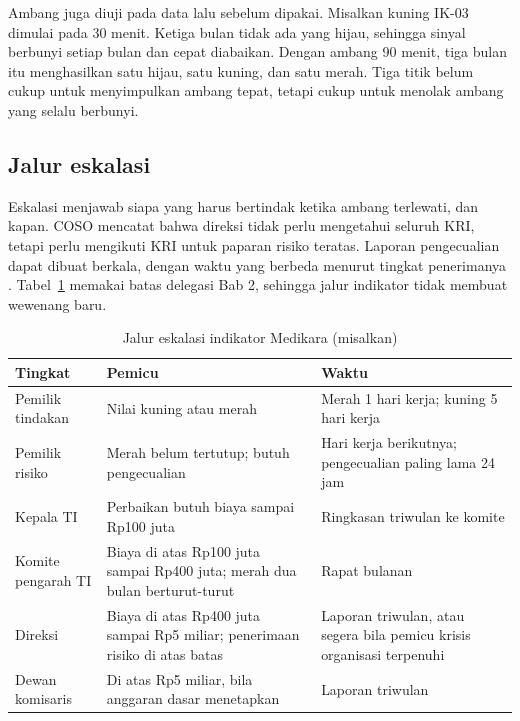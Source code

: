 Ambang juga diuji pada data lalu sebelum dipakai. Misalkan kuning IK-03 dimulai pada 30 menit.
Ketiga bulan tidak ada yang hijau, sehingga sinyal berbunyi setiap bulan dan cepat diabaikan. Dengan
ambang 90 menit, tiga bulan itu menghasilkan satu hijau, satu kuning, dan satu merah. Tiga titik
belum cukup untuk menyimpulkan ambang tepat, tetapi cukup untuk menolak ambang yang selalu berbunyi.

\subsection*{Jalur eskalasi}

Eskalasi menjawab siapa yang harus bertindak ketika ambang terlewati, dan kapan. COSO mencatat bahwa
direksi tidak perlu mengetahui seluruh KRI, tetapi perlu mengikuti KRI untuk paparan risiko teratas.
Laporan pengecualian dapat dibuat berkala, dengan waktu yang berbeda menurut tingkat penerimanya
\cite{c13-coso-kri}. Tabel~\ref{tab:ch13-eskalasi} memakai batas delegasi Bab 2, sehingga jalur
indikator tidak membuat wewenang baru.

\begin{table}[!htb]
  \centering\small
  \caption{Jalur eskalasi indikator Medikara (misalkan)}\label{tab:ch13-eskalasi}
  \begin{tabularx}{\textwidth}{|>{\raggedright\arraybackslash}p{}|>{\raggedright\arraybackslash}X|>{\raggedright\arraybackslash}p{}|}
    \hline
    \textbf{Tingkat} & \textbf{Pemicu} & \textbf{Waktu} \\ \hline
    Pemilik tindakan & Nilai kuning atau merah & Merah 1 hari kerja; kuning 5 hari kerja \\ \hline
    Pemilik risiko & Merah belum tertutup; butuh pengecualian & Hari kerja berikutnya; pengecualian
    paling lama 24 jam \\ \hline
    Kepala TI & Perbaikan butuh biaya sampai Rp100 juta & Ringkasan triwulan ke komite \\ \hline
    Komite pengarah TI & Biaya di atas Rp100 juta sampai Rp400 juta; merah dua bulan berturut-turut
    & Rapat bulanan \\ \hline
    Direksi & Biaya di atas Rp400 juta sampai Rp5 miliar; penerimaan risiko di atas batas & Laporan
    triwulan, atau segera bila pemicu krisis organisasi terpenuhi \\ \hline
    Dewan komisaris & Di atas Rp5 miliar, bila anggaran dasar menetapkan & Laporan triwulan \\
    \hline
  \end{tabularx}
\end{table}

